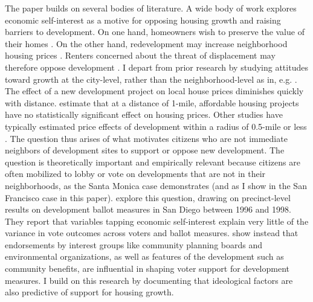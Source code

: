 \documentclass[article,12pt]{memoir}
\begin{document}
The paper builds on several bodies of literature. A wide body of work explores economic self-interest as a motive for opposing housing growth and raising barriers to development. On one hand, homeowners wish to preserve the value of their homes \citep{fischel_homevoter_2001,oliver_local_2012,been_urban_2014,mccabe_no_2016,marble_where_2018}. On the other hand, redevelopment may increase neighborhood housing prices \citep{autor_housing_2014,hornbeck_creative_2017,immergluck_sustainable_2017}. Renters concerned about the threat of displacement may therefore oppose development \citep{hankinson_when_2018}. I depart from prior research by studying attitudes toward growth at the city-level, rather than the neighborhood-level as in, e.g. \citet{hankinson_when_2018}. The effect of a new development project on local house prices diminishes quickly with distance. \citet{diamond_who_2016} estimate that at a distance of 1-mile, affordable housing projects have no statistically significant effect on housing prices. Other studies have typically estimated price effects of development within a radius of 0.5-mile or less \citep{hornbeck_creative_2017,immergluck_sustainable_2017}. The question thus arises of what motivates citizens who are not immediate neighbors of development sites to support or oppose new development. The question is theoretically important and empirically relevant because citizens are often mobilized to lobby or vote on developments that are not in their neighborhoods, as the Santa Monica case demonstrates (and as I show in the San Francisco case in this paper). \citet{gerber_development_2003} explore this question, drawing on precinct-level results on development ballot measures in San Diego between 1996 and 1998. They report that variables tapping economic self-interest explain very little of the variance in vote outcomes across voters and ballot measures. \citeauthor{gerber_development_2003} show instead that endorsements by interest groups like community planning boards and environmental organizations, as well as features of the development such as community benefits, are influential in shaping voter support for development measures. I build on this research by documenting that ideological factors are also predictive of support for housing growth. 
\end{document}

